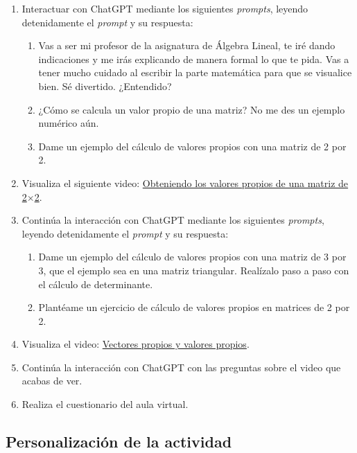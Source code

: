 \documentclass[a4,11pt]{aleph-notas}
\begin{document}
\begin{enumerate}[leftmargin=*,label=\arabic*.]
    \item Interactuar con ChatGPT mediante los siguientes \textit{prompts}, leyendo detenidamente el \textit{prompt} y su respuesta:
    \begin{enumerate}[label=\textit{Prompt \arabic*.},leftmargin=2.1cm]
        \item Vas a ser mi profesor de la asignatura de Álgebra Lineal, te iré dando indicaciones y me irás explicando de manera formal lo que te pida. Vas a tener mucho cuidado al escribir la parte matemática para que se visualice bien. Sé divertido. ¿Entendido?
        \item ¿Cómo se calcula un valor propio de una matriz? No me des un ejemplo numérico aún.
        \item Dame un ejemplo del cálculo de valores propios con una matriz de 2 por 2.
    \end{enumerate}
    \item Visualiza el siguiente video: \href{https://youtu.be/HET8XcIX-n4?si=t4lUbTmWaPOTbtAM}{Obteniendo los valores propios de una matriz de 2$\times$2}.
    \item Continúa la interacción con ChatGPT mediante los siguientes \textit{prompts}, leyendo detenidamente el \textit{prompt} y su respuesta:
    \begin{enumerate}[label=\textit{Prompt \arabic*.},leftmargin=2.1cm,start=4]
        \item Dame un ejemplo del cálculo de valores propios con una matriz de 3 por 3, que el ejemplo sea en una matriz triangular. Realízalo paso a paso con el cálculo de determinante.
        \item Plantéame un ejercicio de cálculo de valores propios en matrices de 2 por 2.
    \end{enumerate}
    \item Visualiza el video: \href{https://youtu.be/Gx0PaWI9eYo?si=oTPRSIfeEopspelW}{Vectores propios y valores propios}.
    \item Continúa la interacción con ChatGPT con las preguntas sobre el video que acabas de ver.
    \item Realiza el cuestionario del aula virtual.
\end{enumerate}

\subsection{Personalización de la actividad}
\end{document}
